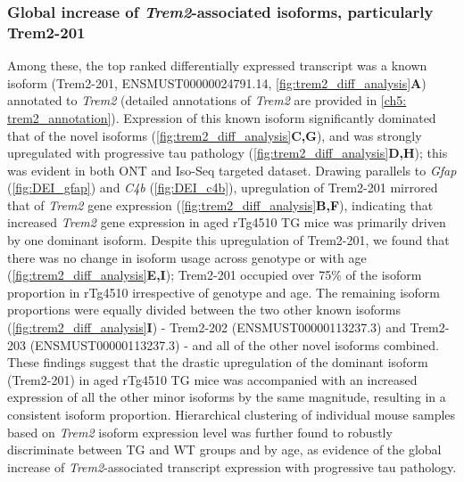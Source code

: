 \subsubsection{Global increase of \textit{Trem2}-associated isoforms, particularly Trem2-201}
Among these, the top ranked differentially expressed transcript was a known isoform (Trem2-201, ENSMUST00000024791.14, \cref{fig:trem2_diff_analysis}\textbf{A}) annotated to \textit{Trem2} (detailed annotations of \textit{Trem2} are provided in \cref{ch5: trem2_annotation}). Expression of this known isoform significantly dominated that of the novel isoforms (\cref{fig:trem2_diff_analysis}\textbf{C,G}), and was strongly upregulated with progressive tau pathology (\cref{fig:trem2_diff_analysis}\textbf{D,H}); this was evident in both ONT and Iso-Seq targeted dataset. Drawing parallels to \textit{Gfap} (\cref{fig:DEI_gfap}) and \textit{C4b} (\cref{fig:DEI_c4b}), upregulation of Trem2-201 mirrored that of \textit{Trem2} gene expression (\cref{fig:trem2_diff_analysis}\textbf{B,F}), indicating that increased \textit{Trem2} gene expression in aged rTg4510 TG mice was primarily driven by one dominant isoform. Despite this upregulation of Trem2-201, we found that there was no change in isoform usage across genotype or with age (\cref{fig:trem2_diff_analysis}\textbf{E,I}); Trem2-201 occupied over 75\% of the isoform proportion in rTg4510 irrespective of genotype and age. The remaining isoform proportions were equally divided between the two other known isoforms (\cref{fig:trem2_diff_analysis}\textbf{I}) - Trem2-202 (ENSMUST00000113237.3) and Trem2-203 (ENSMUST00000113237.3) - and all of the other novel isoforms combined. These findings suggest that the drastic upregulation of the dominant isoform (Trem2-201) in aged rTg4510 TG mice was accompanied with an increased expression of all the other minor isoforms by the same magnitude, resulting in a consistent isoform proportion. Hierarchical clustering of individual mouse samples based on \textit{Trem2} isoform expression level was further found to robustly discriminate between TG and WT groups and by age, as evidence of the global increase of \textit{Trem2}-associated transcript expression with progressive tau pathology.  

